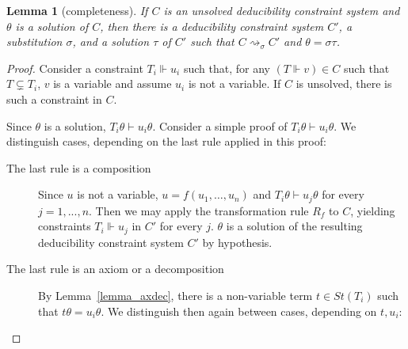 \documentclass[acmtocl,acmnow]{acmtrans2m}
\newtheorem{lemma}[theorem]{Lemma}
\newcommand{\st}{\mathit{St}}
\newcommand{\simpl}{\rightsquigarrow}   \newcommand{\msimpl}{\rightsquigarrow}  \newcommand{\gsimpl}{\leadsto}
\newcommand{\dedsys}[1]{deducibility constraint system}
\begin{document}
\begin{lemma}[completeness]\label{lemma_complet}\label{lemma:completeness}
If $C$ is an unsolved \dedsys{} and $\theta$ is a solution
of $C$, then there is a \dedsys{} $C'$, a substitution $\sigma$,
and a solution $\tau$ of $C'$ such that
$C\simpl_\sigma C'$ and $\theta=\sigma\tau$.
\end{lemma}
\begin{proof}
Consider a constraint $T_i\Vdash u_i$ such that, for any $(T\Vdash v) \in C$ such that
 $T\subsetneq T_i$, $v$ is a variable and assume $u_i$ is not a variable. 
If $C$ is unsolved, there is such a constraint in $C$. 

Since $\theta$ is a solution, $T_i\theta\vdash u_i\theta$. 
Consider a simple proof of
$T_i\theta\vdash u_i\theta$. We distinguish cases, depending on the last
rule applied in this proof:
\begin{description}
\item[The last rule is a composition] Since $u$ is not
a variable, $u=f(u_1,\ldots,u_n)$ and $T_i\theta \vdash u_j\theta$ for
every $j=1,...,n$.  Then we may apply the transformation rule
$R_f$ to $C$, yielding constraints $T_i\Vdash u_j$ in $C'$ for every $j$.
$\theta$ is a solution of the resulting \dedsys{} $C'$ by hypothesis.







\item[The last rule is an axiom or a decomposition] 
By Lemma~\ref{lemma_axdec}, there is a non-variable term $t\in \st(T_i)$
such that $t\theta=u_i\theta$.
We distinguish then again between cases, depending on $t,u_i$:


\end{description}
\end{proof}
\end{document}
